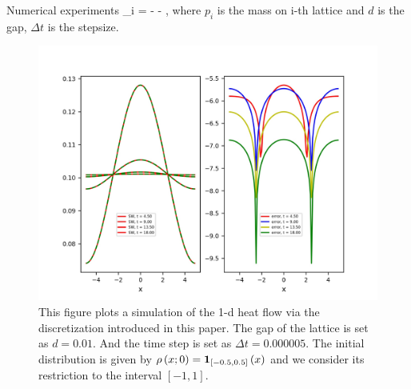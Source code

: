 \documentclass{beamer}
\begin{document}
\begin{frame}{Numerical experiments}
	\small
	\bequn
	_{i} = -  \lp {}\log {} - \log {} \rp,
\eequn
where $p_i$ is the mass on i-th lattice and $d$ is the gap, $\Delta t$ is the stepsize.
\begin{figure}[h]
  \centering
  \centerline{\includegraphics[width=0.75\linewidth]{heat1D.jpg}}
  \caption{\scriptsize{This figure plots a simulation of the 1-d heat flow via the discretization introduced in this paper. The gap of the lattice is set as $d = 0.01$. And the time step is set as $\Delta t = 0.000005$. The initial distribution is given by $\rho\left( x; 0 \right) = \mathbf{1}_{[-0.5, 0.5]}\left( x \right)$ and we consider its restriction to the interval $[-1, 1]$.}}
\end{figure}
\end{frame}
\end{document}
